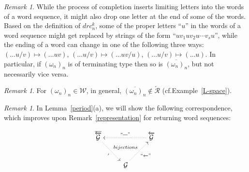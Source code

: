 \documentclass{amsart}
\theoremstyle{definition}
\theoremstyle{remark}
\newtheorem{remark}[theorem]{Remark}
\numberwithin{equation}{section}
\begin{document}
\begin{remark}\label{insertions}
   While the process of completion inserts limiting letters into the words of a word sequence, it might also drop one letter at the  end of some of the words. Based on  the definition of $drc_n^k$, some of the proper letters ``$u$'' in the words of a word sequence might get replaced by strings of the form ``$uv_1uv_2u\cdots v_s u$'', while the ending of a word can change in one of the following three ways:  $(\dots u/v)\mapsto (\dots uv)$, $(\dots u/v)\mapsto (\dots uv/u)$, $(\dots u/v)\mapsto (\dots u)$. In particular, if $(\omega_n)_n$ is of terminating type then so is
$\overline{(\omega_n)_n}$, but not necessarily vice versa.
\end{remark}

\begin{remark} For $(\omega_n)_n\in {\mathcal W}$, in general, $\overline{(\omega_n)_n}\not\in \overleftarrow{\mathcal R}$ (cf.\@ Example~\ref{L-space}).
\end{remark}

\begin{remark} In Lemma~\ref{period}(a), we will show the following correspondence, which
improves upon Remark~\ref{representation} for returning word sequences:

\hspace{-18pt} \parbox{8in}{
\[
\xymatrix{ \overline{\overleftarrow{\mathcal G}} \ar@{.>}[dr]_{'}^{ bijections} & &  \overleftarrow{\mathcal G}\; \ar@{.>}_{``\overline{\;\;\;}"}[ll] \\
& \; {\mathcal G} \ar@{.>}_{``\overleftarrow{\;\;\;}"}[ur]}
\]}

\end{remark}
\end{document}
